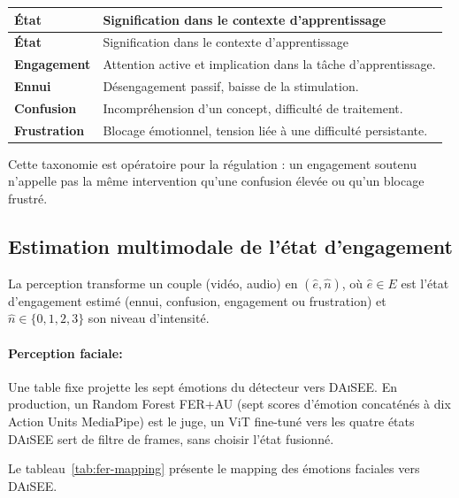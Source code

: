 {\small
\renewcommand{\arraystretch}{1.18}
\setlength{\tabcolsep}{4pt}
\begin{xltabular}{\textwidth}{|>{\bfseries}l|X|}
\hline
{}
État & Signification dans le contexte d'apprentissage \\
\hline
\endfirsthead
\hline
{}
État & Signification dans le contexte d'apprentissage \\
\hline
\endhead
\endfoot
\endlastfoot
Engagement  & Attention active et implication dans la tâche d'apprentissage. \\
\hline
Ennui     & Désengagement passif, baisse de la stimulation. \\
\hline
Confusion   & Incompréhension d'un concept, difficulté de traitement. \\
\hline
Frustration & Blocage émotionnel, tension liée à une difficulté persistante. \\
\hline
\end{xltabular}
\label{tab:daisee-etats}
}

Cette taxonomie est opératoire pour la régulation : un engagement soutenu
n'appelle pas la même intervention qu'une confusion élevée ou qu'un
blocage frustré.

\subsection{Estimation multimodale de l'état d'engagement}
\label{sec:perception}
\label{subsec:fer-appris}
\label{subsec:ser-appris}
\label{subsec:vote}

La perception transforme un couple (vidéo, audio) en
$(\hat{e}, \hat{n})$, où $\hat{e} \in E$ est l'état d'engagement
estimé (ennui, confusion, engagement ou frustration) et $\hat{n}
\in \{0,1,2,3\}$ son niveau d'intensité. 


\paragraph{Perception faciale:}
Une table fixe  projette les sept
émotions du détecteur vers \textsc{DAiSEE}. En production, un Random Forest
FER+AU (sept scores d'émotion concaténés à dix Action Units
MediaPipe) est le juge, un ViT fine-tuné vers les quatre états
\textsc{DAiSEE} sert de filtre de frames, sans choisir l'état
fusionné.

Le tableau~\ref{tab:fer-mapping} présente le mapping des émotions faciales vers \textsc{DAiSEE}.

